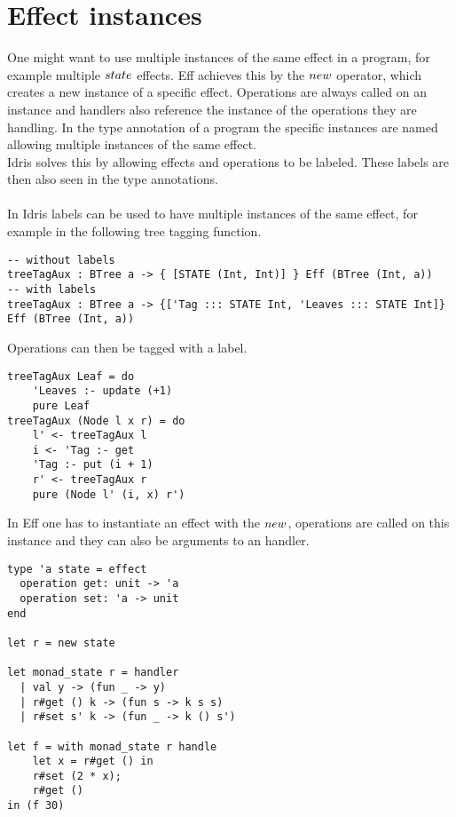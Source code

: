 \documentclass[12pt]{article}
\begin{document}
\section{Effect instances}
One might want to use multiple instances of the same effect in a program, for example multiple $\mathnormal{state}$ effects. Eff achieves this by the $\mathnormal{new}$ operator, which creates a new instance of a specific effect. Operations are always called on an instance and handlers also reference the instance of the operations they are handling. In the type annotation of a program the specific instances are named allowing multiple instances of the same effect. \\
Idris solves this by allowing effects and operations to be labeled. These labels are then also seen in the type annotations.
\\\\
In Idris labels can be used to have multiple instances of the same effect, for example in the following tree tagging function.
\begin{lstlisting}
-- without labels
treeTagAux : BTree a -> { [STATE (Int, Int)] } Eff (BTree (Int, a))
-- with labels
treeTagAux : BTree a -> {['Tag ::: STATE Int, 'Leaves ::: STATE Int]} Eff (BTree (Int, a))
\end{lstlisting}
\newpage
Operations can then be tagged with a label.
\begin{lstlisting}
treeTagAux Leaf = do
	'Leaves :- update (+1)
	pure Leaf
treeTagAux (Node l x r) = do
	l' <- treeTagAux l
	i <- 'Tag :- get
	'Tag :- put (i + 1)
	r' <- treeTagAux r
	pure (Node l' (i, x) r')
\end{lstlisting}

In Eff one has to instantiate an effect with the $\mathnormal{new}$, operations are called on this instance and they can also be arguments to an handler.
\begin{lstlisting}
type 'a state = effect
  operation get: unit -> 'a
  operation set: 'a -> unit
end

let r = new state

let monad_state r = handler
  | val y -> (fun _ -> y)
  | r#get () k -> (fun s -> k s s)
  | r#set s' k -> (fun _ -> k () s')

let f = with monad_state r handle
    let x = r#get () in
    r#set (2 * x);
    r#get ()
in (f 30)
\end{lstlisting}
\end{document}

